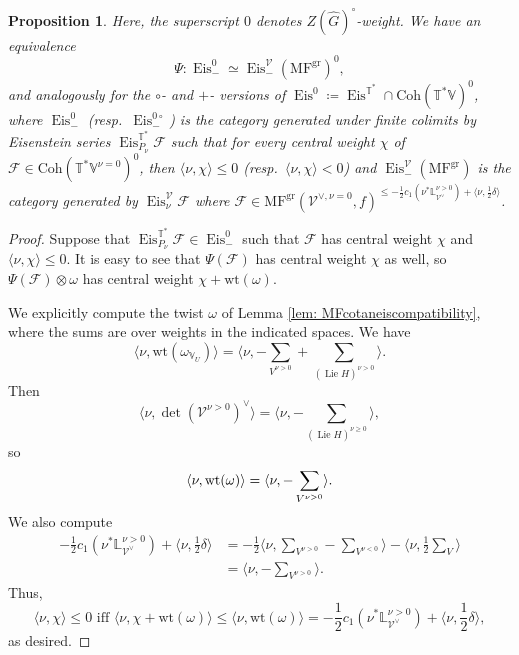 \documentclass{amsart}
\newtheorem{proposition}[theorem]{Proposition}
\theoremstyle{definition}
\theoremstyle{remark}
\numberwithin{equation}{section}
\DeclareMathOperator{\Lie}{Lie}
\newcommand{\mc}{\mathcal}
\newcommand{\wh}{\widehat}
\DeclareMathOperator{\Eis}{\mathrm{Eis}}
\newcommand{\Coh}{\mathrm{Coh}}
\newcommand{\V}{\mathbb{V}}
\newcommand{\T}{\mathbb{T}}
\renewcommand{\L}{\mathbb{L}}
\DeclareMathOperator{\gr}{gr}
\newcommand{\wt}{\mathrm{wt}}
\newcommand{\MF}{\mathrm{MF}}
\begin{document}
\begin{proposition}{\label{prop: magickoszuleiscompatibility}}
Here, the superscript $0$ denotes $Z(\wh G)^\circ$-weight. We have an equivalence
\begin{equation*}
    \Psi: \Eis_-^0 \simeq \Eis^{\mc{V}}_-(\MF^{\gr})^0,
\end{equation*}
and analogously for the $\circ$- and $+$- versions of $\Eis^0\coloneq\Eis^{\T^*}\cap \Coh(\T^*\V)^0$, where $\Eis_{-}^{0}$ (resp.~$\Eis^{0 \circ}_-$) is the category generated under finite colimits by Eisenstein series $\Eis^{\T^{\ast}}_{P_\nu} \mc{F}$ such that for every central weight $\chi$ of $\mc{F}\in \Coh(\T^*\V^{\nu=0})^0$, then $\langle \nu, \chi \rangle \leq 0$ (resp.~$\langle \nu, \chi \rangle < 0$) and $\Eis^{\mc{V}}_-(\MF^{\gr})$ is the category generated by $\Eis^{\mc{V}}_\nu \mc{F}$ where $\mc{F} \in \MF^{\gr}(\mc{V}^{\vee,\nu=0}, f)^{ \leq -\frac{1}{2} c_1(\nu^* \L^{\nu > 0}_{\mc{V}^{\vee}} ) + \langle \nu, \frac{1}{2}\delta \rangle}$.
\end{proposition}
\begin{proof}  
Suppose that $\Eis^{\T^{\ast}}_{P_\nu} \mc{F} \in \Eis^0_-$ such that $\mc{F}$ has central weight $\chi$ and $\langle \nu, \chi \rangle  \leq 0$. It is easy to see that $\Psi(\mc{F})$ has central weight $\chi$ as well, so $\Psi(\mc{F}) \otimes \omega$ has central weight $\chi + \wt(\omega)$. 

We explicitly compute the twist $\omega$ of Lemma \ref{lem: MFcotaneiscompatibility}, where the sums are over weights in the indicated spaces.  We have
\begin{equation*}
\langle \nu, \wt(\omega_{\V_U}) \rangle = \langle \nu, -\sum\limits_{V^{\nu > 0}} + \sum\limits_{(\Lie H)^{\nu > 0}} \rangle.
\end{equation*}
Then
\begin{equation*}
    \langle \nu, \det(\mc{V}^{\nu > 0})^{\vee} \rangle = \langle \nu,  - \sum\limits_{(\Lie H)^{\nu \geq 0}}  \rangle,
\end{equation*}
so
\begin{equation}{\label{eqn: omegaformula}}
    \langle \nu, \wt(\omega) \rangle =\langle \nu,   - \sum\limits_{V^{\nu > 0}} \rangle.
\end{equation}
We also compute
\begin{align*}
    -\frac{1}{2}c_1(\nu^{\ast} \L^{\nu>0}_{\mc{V}^{\vee}}) + \langle \nu, \frac{1}{2}\delta \rangle &= -\frac{1}{2}\langle \nu , \sum\limits_{V^{\nu > 0}} - \sum\limits_{V^{\nu<0}} \rangle - \langle \nu, \frac{1}{2}\sum\limits_V \rangle\\
    &= \langle \nu, - \sum\limits_{V^{\nu>0}} \rangle.
\end{align*}
Thus,
\begin{equation*}
    \langle \nu, \chi \rangle \leq 0 \text{ iff }  \langle \nu, \chi + \wt(\omega) \rangle \leq \langle \nu, \wt(\omega) \rangle = -\frac{1}{2}c_1(\nu^{\ast} \L^{\nu>0}_{\mc{V}^{\vee}}) + \langle \nu, \frac{1}{2}\delta \rangle,
\end{equation*}
as desired.
\end{proof}
\end{document}
